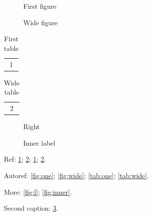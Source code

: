 \documentclass{article}
\begin{document}
\begin{figure}[h]\centering{}\end{figure}
\begin{figure}[h]
  \centering
  \caption{First figure}\label{fig:one}
\end{figure}
\begin{figure}[h]
  \centering
  \caption{Wide figure}\label{fig:wide}
\end{figure}
\begin{table}[h]
  \centering
  \caption{First table}\label{tab:one}
  \begin{tabular}{c}1\end{tabular}
\end{table}
\begin{table}[h]
  \centering
  \caption{Wide table}\label{tab:wide}
  \begin{tabular}{c}2\end{tabular}
\end{table}
\begin{figure}[h]
  \begin{minipage}{.45\linewidth}\caption{Left}\label{fig:l}\end{minipage}
  \begin{minipage}{.45\linewidth}\caption{Right}\label{fig:r}\end{minipage}
\end{figure}
\begin{figure}[h]
  \centering
  \caption{Inner label\label{fig:inner}}
\end{figure}

Ref: \ref{fig:one}; \ref{fig:wide}; \ref{tab:one}; \ref{tab:wide}.

Autoref: \autoref{fig:one}; \autoref{fig:wide}; \autoref{tab:one}; \autoref{tab:wide}.

More: \ref{fig:l}; \autoref{fig:inner}.

Second caption: \ref{fig:r}.
\end{document}
